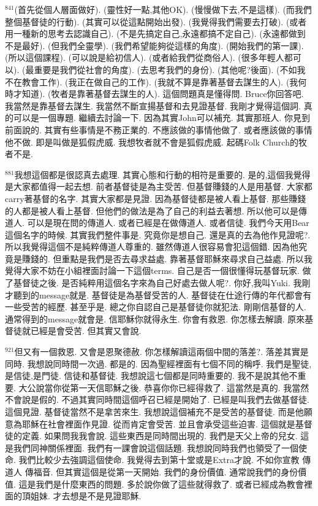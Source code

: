 \documentclass{book}
\begin{document}
$^{841}$(首先從個人層面做好).
(靈性好一點,其他OK).
(慢慢做下去,不是這樣).
(而我們整個基督徒的行動).
(其實可以從這點開始出發).
(我覺得我們需要去打破).
(或者用一種新的思考去認識自己).
(不是先搞定自己,永遠都搞不定自己).
(永遠都做到不是最好).
(但我們全靈學).
(我們希望能夠從這樣的角度).
(開始我們的第一課).
(所以這個課程).
(可以說是給初信人).
(或者給我們從商俗人).
(很多年輕人都可以).
(最重要是我們從社會的角度).
(去思考我們的身份).
(其他呢?後面).
(不如我不在教會工作).
(我正在做自己的工作).
(我就不算是靠著基督去謀生的人).
(我何時才知道).
(牧者是靠著基督去謀生的人).
這個問題真是懂得問.
Bruce你回答吧.
我當然是靠基督去謀生.
我當然不斷宣揚基督和去見證基督.
我剛才覺得這個詞.
真的可以是一個專題.
繼續去討論一下.
因為其實John可以補充.
其實那班人.
你見到前面說的.
其實有些事情是不務正業的.
不應該做的事情他做了.
或者應該做的事情他不做.
即是叫做是狐假虎威.
我想牧者就不會是狐假虎威.
起碼Folk Church的牧者不是.

$^{881}$我想這個都是很認真去處理.
其實心態和行動的相符是重要的.
是的,這個我覺得是大家都值得一起去想.
前者基督徒是為主受苦.
但基督賺錢的人是用基督.
大家都carry著基督的名字.
其實大家都是見證.
因為基督徒都是被人看上基督.
那些賺錢的人都是被人看上基督.
但他們的做法是為了自己的利益去著想.
所以他可以是傳道人.
可以是現在問的傳道人.
或者已經是在做傳道人.
或者信徒.
我們今天用Bear這個名字的時候.
其實我們整件事是.
究竟你是想自己.
還是真的去為他作見證呢?.
所以我覺得這個不是純粹傳道人尊重的.
雖然傳道人很容易會犯這個錯.
因為他究竟是賺錢的.
但重點是我們是否去尋求益處.
靠著基督耶穌來尋求自己益處.
所以我覺得大家不妨在小組裡面討論一下這個terms.
自己是否一個很懂得玩基督玩家.
做了基督徒之後.
是否純粹用這個名字來為自己好處去做人呢?.
你好,我叫Yuki.
我剛才聽到的message就是.
基督徒是為基督受苦的人.
基督徒在仕途行傳的年代都會有一些受苦的經歷.
甚至乎是.
總之你自認自己是基督徒你就犯法.
剛剛信基督的人.
通常得到的message就會是.
信耶穌你就得永生.
你會有救恩.
你怎樣去解讀.
原來基督徒就已經是會受苦.
但其實又會說.

$^{921}$但又有一個救恩.
又會是恩聚德赦.
你怎樣解讀這兩個中間的落差?.
落差其實是同時.
我想說同時間一次過.
都是的.
因為聖經裡面有七個不同的稱呼.
我們是聖徒,是信徒,是門徒.
信徒和基督徒.
我想說這七個都是同時重要的.
我不是說其他不重要.
大公說當你從第一天信耶穌之後.
恭喜你你已經得救了.
這當然是真的.
我當然不會說是假的.
不過其實同時間這個呼召已經是開始了.
已經是叫我們去做基督徒.
這個見證.
基督徒當然不是拿苦來生.
我想說這個補充不是受苦的基督徒.
而是他願意為耶穌在社會裡面作見證.
從而肯定會受苦.
並且會承受這些迫害.
這個就是基督徒的定義.
如果問我我會說.
這些東西是同時間出現的.
我們是天父上帝的兒女.
這是我們同神關係裡面.
我們有一課會說這個話題.
我想說同時我們也領受了一個使命.
我們比較少去強調這個使命.
我覺得去到第十堂或是Extra才說.
不如你宣教 傳道人 傳福音.
但其實這個是從第一天開始.
我們的身份價值.
通常說我們的身份價值.
這是我們是什麼東西的問題.
多於說你做了這些就得救了.
或者已經成為教會裡面的頂姐妹.
才去想是不是見證耶穌.
\end{document}
